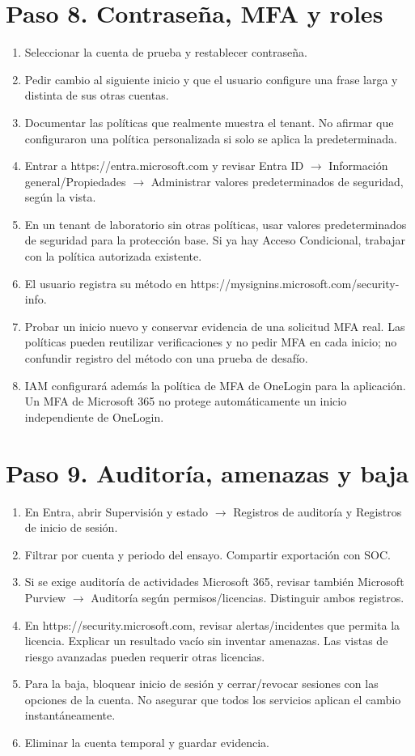\documentclass[12pt,a4paper]{article}
\begin{document}
\section*{Paso 8. Contraseña, MFA y roles}
\begin{enumerate}
\item Seleccionar la cuenta de prueba y restablecer contraseña.
\item Pedir cambio al siguiente inicio y que el usuario configure una frase larga y distinta de sus otras cuentas.
\item Documentar las políticas que realmente muestra el tenant. No afirmar que configuraron una política personalizada si solo se aplica la predeterminada.
\item Entrar a \textnormal{https:/\allowbreak{}/\allowbreak{}entra.microsoft.com} y revisar Entra ID \(\rightarrow\) Información general/Propiedades \(\rightarrow\) Administrar valores predeterminados de seguridad, según la vista.
\item En un tenant de laboratorio sin otras políticas, usar valores predeterminados de seguridad para la protección base. Si ya hay Acceso Condicional, trabajar con la política autorizada existente.
\item El usuario registra su método en \textnormal{https:/\allowbreak{}/\allowbreak{}mysignins.microsoft.com/\allowbreak{}security-info}.
\item Probar un inicio nuevo y conservar evidencia de una solicitud MFA real. Las políticas pueden reutilizar verificaciones y no pedir MFA en cada inicio; no confundir registro del método con una prueba de desafío.
\item IAM configurará además la política de MFA de OneLogin para la aplicación. Un MFA de Microsoft 365 no protege automáticamente un inicio independiente de OneLogin.
\end{enumerate}
\section*{Paso 9. Auditoría, amenazas y baja}
\begin{enumerate}
\item En Entra, abrir Supervisión y estado \(\rightarrow\) Registros de auditoría y Registros de inicio de sesión.
\item Filtrar por cuenta y periodo del ensayo. Compartir exportación con SOC.
\item Si se exige auditoría de actividades Microsoft 365, revisar también Microsoft Purview \(\rightarrow\) Auditoría según permisos/licencias. Distinguir ambos registros.
\item En \textnormal{https:/\allowbreak{}/\allowbreak{}security.microsoft.com}, revisar alertas/incidentes que permita la licencia. Explicar un resultado vacío sin inventar amenazas. Las vistas de riesgo avanzadas pueden requerir otras licencias.
\item Para la baja, bloquear inicio de sesión y cerrar/revocar sesiones con las opciones de la cuenta. No asegurar que todos los servicios aplican el cambio instantáneamente.
\item Eliminar la cuenta temporal y guardar evidencia.
\end{enumerate}
\end{document}

